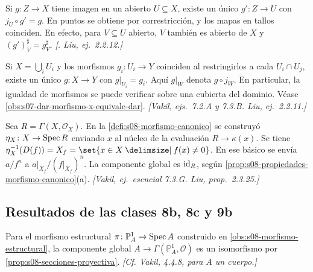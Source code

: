 \begin{lema}
\label{lema:s10-factorizacion-abierto}
Si \(g\colon Z\to X\) tiene imagen en un abierto \(U\subseteq X\), existe un único \(g'\colon Z\to U\) con \(j_U\circ g'=g\). En puntos se obtiene por correstricción, y los mapas en tallos coinciden. En efecto, para \(V\subseteq U\) abierto, \(V\) también es abierto de \(X\) y \((g')_V^\sharp=g_V^\sharp\). \emph{[. Liu, ej.~2.2.12.]}
\end{lema}

\begin{lema}
\label{lema:s10-pegado-morfismos}
Si \(X=\bigcup_i U_i\) y los morfismos \(g_i\colon U_i\to Y\) coinciden al restringirlos a cada \(U_i\cap U_j\), existe un único \(g\colon X\to Y\) con \(g|_{U_i}=g_i\). Aquí \(g|_W\) denota \(g\circ j_W\). En particular, la igualdad de morfismos se puede verificar sobre una cubierta del dominio. Véase \cref{obs:s07-dar-morfismo-x-equivale-dar}. \emph{[Vakil, ejs.~7.2.A y 7.3.B. Liu, ej.~2.2.11.]}
\end{lema}

\begin{defi}
\label{defi:s10-canonico-ocho}
Sea \(R=\Gamma(X,\mathcal O_X)\). En la \cref{defi:s08-morfismo-canonico} se construyó \(\eta_X\colon X\to\operatorname{Spec} R\) enviando \(x\) al núcleo de la evaluación \(R\to\kappa(x)\). Se tiene \(\eta_X^{-1}(D(f))=X_f=\set{x\in X\given f(x)\ne0}\). En ese básico se envía \(a/f^n\) a \(a|_{X_f}/(f|_{X_f})^n\). La componente global es \(\operatorname{id}_R\), según \cref{prop:s08-propiedades-morfismo-canonico}(a). \emph{[Vakil, ej.~esencial 7.3.G. Liu, prop.~2.3.25.]}
\end{defi}

\subsection{Resultados de las clases 8b, 8c y 9b}

\begin{prop}
\label{prop:s10-globales-proyectiva}
Para el morfismo estructural \(\pi\colon\mathbb P_A^1\to\operatorname{Spec} A\) construido en \cref{obs:s08-morfismo-estructural}, la componente global \(A\to\Gamma(\mathbb P_A^1,\mathcal O)\) es un isomorfismo por \cref{prop:s08-secciones-proyectiva}. \emph{[Cf. Vakil, 4.4.8, para \(A\) un cuerpo.]}
\end{prop}

